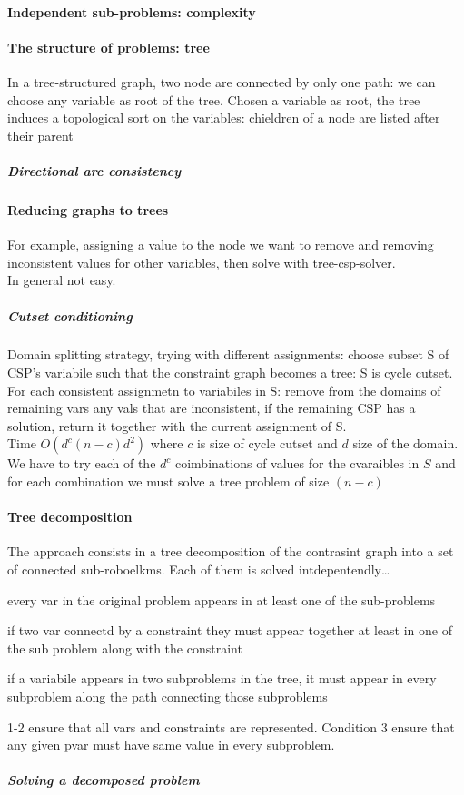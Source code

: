 \documentclass[10pt]{report}
\begin{document}
\paragraph{Independent sub-problems: complexity}
\paragraph{The structure of problems: tree} In a tree-structured graph, two node are connected by only one path: we can choose any variable as root of the tree. Chosen a variable as root, the tree induces a topological sort on the variables: chieldren of a node are listed after their parent
\subparagraph{Directional arc consistency} %
\paragraph{Reducing graphs to trees} For example, assigning a value to the node we want to remove and removing inconsistent values for other variables, then solve with tree-csp-solver.\\
In general not easy.
\subparagraph{Cutset conditioning} Domain splitting strategy, trying with different assignments: choose subset S of CSP's variabile such that the constraint graph becomes a tree: S is cycle cutset. For each consistent assignmetn to variabiles in S: remove from the domains of remaining vars any vals that are inconsistent, if the remaining CSP has a solution, return it together with the current assignment of S.\\
Time $O(d^c(n-c)d^2)$ where $c$ is size of cycle cutset and $d$ size of the domain. We have to try each of the $d^c$ coimbinations of values for the cvaraibles in $S$ and for each combination we must solve a tree problem of size $(n-c)$
\paragraph{Tree decomposition} The approach consists in a tree decomposition of the contrasint graph into a set of connected sub-roboelkms. Each of them is solved intdepentendly\ldots\\ %
\begin{list}{}{}
	\item every var in the original problem appears in at least one of the sub-problems
	\item if two var connectd by a constraint they must appear together at least in one of the sub problem along with the constraint
	\item if a variabile appears in two subproblems in the tree, it must appear in every subproblem along the path connecting those subproblems
\end{list}
1-2 ensure that all vars and constraints are represented. Condition 3 ensure that any given pvar must have same value in every subproblem.
\subparagraph{Solving a decomposed problem} %
\end{document}
